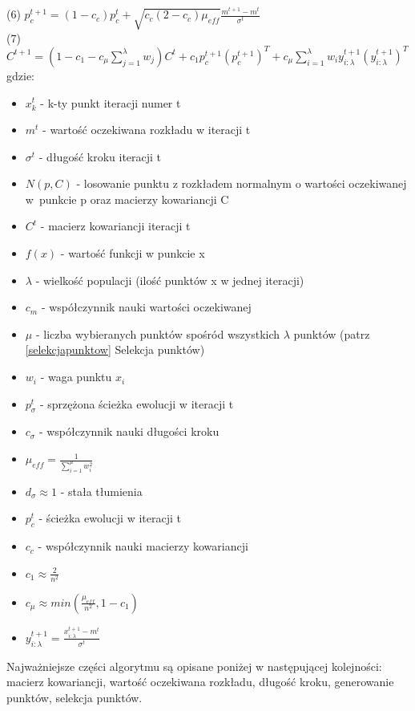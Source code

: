 \documentclass{mini}
\begin{document}
(6)\hspace{12ex} $p_c^{t+1} = (1-c_c)p_c^t+\sqrt{c_c(2-c_c)\mu_{eff}}\frac{m^{t+1}-m^t}{\sigma^t}$ \\
(7)\hspace{12ex} $C^{t+1} = (1-c_1-c_\mu\sum\limits_{j=1}^\lambda w_j)C^t+c_1p_c^{t+1}{(p_c^{t+1})}^T+c_\mu \sum\limits_{i=1}^\lambda w_iy_{i:\lambda}^{t+1}{(y_{i:\lambda}^{t+1})}^T$
\newline
gdzie:
\begin{itemize}[noitemsep]
\item $x_k^t$ - k-ty punkt iteracji numer t
\item $m^t$ - wartość oczekiwana rozkładu w iteracji t
\item $\sigma^t$ - długość kroku iteracji t
\item $N(p,C)$ - losowanie punktu z rozkładem normalnym o wartości oczekiwanej w~punkcie p oraz macierzy kowariancji C
\item $C^t$ - macierz kowariancji iteracji t
\item $f(x)$ - wartość funkcji w punkcie x
\item $\lambda$ - wielkość populacji (ilość punktów x w jednej iteracji)
\item $c_m$ - współczynnik nauki wartości oczekiwanej
\item $\mu$ - liczba wybieranych punktów spośród wszystkich $\lambda$ punktów (patrz \ref{selekcjapunktow} Selekcja punktów)
\item $w_i$ - waga punktu $x_i$
\item $p_\sigma^t$ - sprzężona ścieżka ewolucji w iteracji t
\item $c_\sigma$ - współczynnik nauki długości kroku
\item $\mu_{eff}=\frac{1}{\sum\limits_{i=1}^\mu w_i^2}$
\item $d_\sigma \approx 1$ - stała tłumienia
\item $p_c^t$ - ścieżka ewolucji w iteracji t
\item $c_c$ - współczynnik nauki macierzy kowariancji
\item $c_1 \approx \frac{2}{n^2}$
\item $c_\mu \approx min(\frac{\mu_{eff}}{n^2}, 1-c_1)$
\item $y_{i:\lambda}^{t+1} = \frac{x_{i:\lambda}^{t+1}-m^t}{\sigma^t}$
\end{itemize}

Najważniejsze części algorytmu są opisane poniżej w następującej kolejności: macierz kowariancji, wartość oczekiwana rozkładu, długość kroku, generowanie punktów, selekcja punktów.
\end{document}
